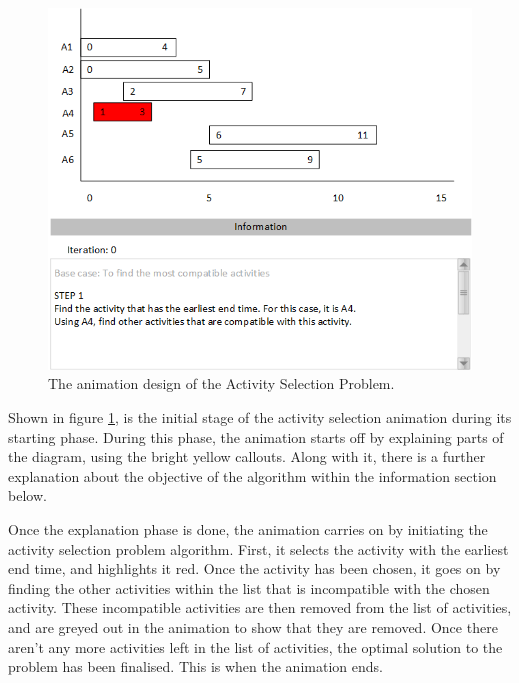 \begin{figure}[H]
\centering
\includegraphics[scale=0.9]{images/report_images/animationDesignActivitySelectionProblem_STEP1.png}
\caption{The animation design of the Activity Selection Problem.}
\label{animationDesignActivitySelectionProblem}
\end{figure}

Shown in figure \ref{animationDesignActivitySelectionProblem}, is the initial stage of the activity selection animation during its starting phase. During this phase, the animation starts off by explaining parts of the diagram, using the bright yellow callouts. Along with it, there is a further explanation about the objective of the algorithm within the information section below.

Once the explanation phase is done, the animation carries on by initiating the activity selection problem algorithm. First, it selects the activity with the earliest end time, and highlights it red. Once the activity has been chosen, it goes on by finding the other activities within the list that is incompatible with the chosen activity. These incompatible activities are then removed from the list of activities, and are greyed out in the animation to show that they are removed. Once there aren't any more activities left in the list of activities, the optimal solution to the problem has been finalised. This is when the animation ends. 

\newpage

